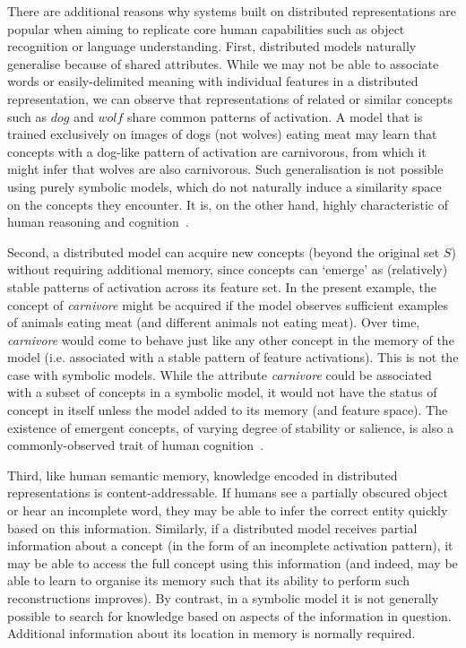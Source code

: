 \documentclass[11pt,letterpaper]{article}
\begin{document}
There are additional reasons why systems built on distributed representations are popular when aiming to replicate core human capabilities such as object recognition or language understanding. First, distributed models naturally generalise because of shared attributes. While we may not be able to associate words or easily-delimited meaning with individual features in a distributed representation, we can observe that representations of related or similar concepts such as \(dog\) and \(wolf\) share common patterns of activation. A model that is trained exclusively on images of dogs (not wolves) eating meat may learn that concepts with a dog-like pattern of activation are carnivorous, from which it might infer that wolves are also carnivorous. Such generalisation is not possible using purely symbolic models, which do not naturally induce a similarity space on the concepts they encounter. It is, on the other hand, highly characteristic of human reasoning and cognition~\citep{rosch1976basic}. 

Second, a distributed model can acquire new concepts (beyond the original set \(S\)) without requiring additional memory, since concepts can `emerge' as (relatively) stable patterns of activation across its feature set. In the present example, the concept of \emph{carnivore} might be acquired if the model observes sufficient examples of animals eating meat (and different animals not eating meat). Over time, \emph{carnivore} would come to behave just like any other concept in the memory of the model (i.e. associated with a stable pattern of feature activations). This is not the case with symbolic models. While the attribute \emph{carnivore} could be associated with a subset of concepts in a symbolic model, it would not have the status of concept in itself unless the model added to its memory (and feature space). The existence of emergent concepts, of varying degree of stability or salience, is also a commonly-observed trait of human cognition~\citep{patterson2007you}. 

Third, like human semantic memory, knowledge encoded in distributed representations is content-addressable. If humans see a partially obscured object or hear an incomplete word, they may be able to infer the correct entity quickly based on this information. Similarly, if a distributed model receives partial information about a concept (in the form of an incomplete activation pattern), it may be able to access the full concept using this information (and indeed, may be able to learn to organise its memory such that its ability to perform such reconstructions improves). By contrast, in a symbolic model it is not generally possible to search for knowledge based on aspects of the information in question. Additional information about its location in memory is normally required. 
\end{document}
